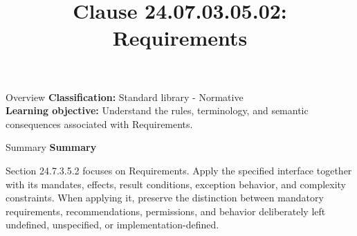 \documentclass[10pt,letterpaper]{article}
\title{Clause 24.07.03.05.02: Requirements}
\author{}
\date{}
\begin{document}
\maketitle
\begin{CornellOverviewBox}{Overview}
\textbf{Classification:} Standard library - Normative\\[2pt]
\textbf{Learning objective:} Understand the rules, terminology, and semantic consequences associated with Requirements.
\end{CornellOverviewBox}\begin{CornellSummaryBox}{Summary}
{\sffamily\bfseries\color{Accent} Summary}\par\vspace{3pt}Section 24.7.3.5.2 focuses on Requirements. Apply the specified interface together with its mandates, effects, result conditions, exception behavior, and complexity constraints. When applying it, preserve the distinction between mandatory requirements, recommendations, permissions, and behavior deliberately left undefined, unspecified, or implementation-defined.
\end{CornellSummaryBox}
\end{document}
